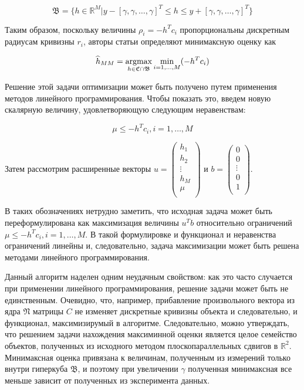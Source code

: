 \documentclass[a4paper,12pt, titlepage]{article}
\begin{document}
$$
\mathfrak{B} = \{h \in \mathbb{R}^{M} |
y - [\gamma, \gamma, \ldots, \gamma]^{T} \leq h \leq
y + [\gamma, \gamma, \ldots, \gamma]^{T}\}
$$

Таким образом, поскольку величины $\rho_{i} = - h^{T} c_{i}$ пропорциональны
дискретным радиусам кривизны $r_{i}$, авторы статьи определяют минимаксную
оценку как

$$
\widehat{h}_{MM} =
\operatornamewithlimits{argmax}_{h \in \mathfrak{C} \cap \mathfrak{B}}
\min_{i = 1, \ldots, M} ( - h^{T} c_{i})
$$

Решение этой задачи оптимизации может быть получено путем применения методов
линейного программирования. Чтобы показать это, введем новую скалярную величину,
удовлетворяющую следующим неравенствам:

$$
\mu \leq - h^{T} c_{i}, i = 1, \ldots, M
$$

Затем рассмотрим расширенные векторы
$u = \left(
\begin{array}{c}
 h_{1} \\
 h_{2} \\
 \vdots \\
 h_{M} \\
 \mu \\
\end{array}
\right)$ и
$ b = \left(\begin{array}{c}
 0 \\
 0 \\
 \vdots \\
 0 \\
 1 \\
\end{array}
\right)$.

В таких обозначениях нетрудно заметить, что исходная задача может
быть переформулирована как максимизация величины $u^{T} b$ относительно
ограничений $\mu \leq - h^{T} c_{i}, i = 1, \ldots, M$. В такой формулировке и
функционал и неравенства ограничений линейны и, следовательно, задача
максимизации может быть решена методами линейного программирования.

Данный алгоритм наделен одним неудачным свойством: как это часто случается при
применении линейного программирования, решение задачи может быть не
единственным. Очевидно, что, например, прибавление произвольного вектора из ядра
$\mathfrak{N}$ матрицы $C$ не изменяет дискретные кривизны объекта и
следовательно, и функционал, максимизирумый в алгоритме. Следовательно, можно
утверждать, что решением задачи нахождения максиминной оценки является целое
семейство объектов, полученных из исходного методом плоскопараллельных сдвигов в
$\mathbb{R}^{2}$. Минимаксная оценка привязана к величинам, полученным из
измерений только внутри гиперкуба $\mathfrak{B}$, и поэтому при увеличении
$\gamma$ полученная минимаксная все меньше зависит от полученных из эксперимента
данных.
\end{document}
